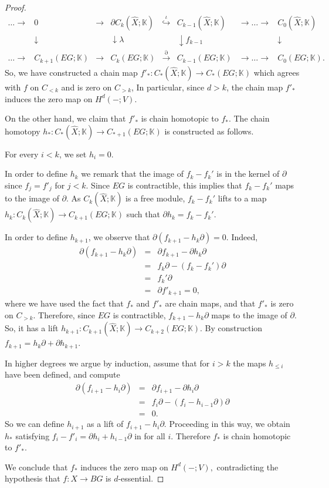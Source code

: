 \documentclass[10pt,a4paper]{amsart}
\begin{document}
\begin{proof}
$$\begin{array}{cccccccc}
\dots\rightarrow & 0&\rightarrow &\partial C_k(\hat X;\mathbb K)&\stackrel{\iota}\hookrightarrow &C_{k-1}(\hat X;\mathbb K)&\rightarrow\dots\rightarrow &C_0(\hat X;\mathbb K)\\
&\downarrow&&\downarrow \lambda&&\downarrow f_{k-1}&&\downarrow\\
\dots\rightarrow & C_{k+1}(EG;\mathbb K)&\rightarrow &C_k(EG;\mathbb K)&\stackrel{\partial}\rightarrow &C_{k-1}(EG;\mathbb K)&\rightarrow\dots\rightarrow &C_0(EG;\mathbb K).
\end{array}
$$
So, we have constructed a chain map $f'_*:C_*(\hat X;\mathbb K)\rightarrow C_*(EG;\mathbb K)$ which agrees with $f$ on $C_{<k}$ and is zero on $C_{>k}$, In particular, since $d>k$, the chain map $f'_*$ induces the zero map on $H^d(-;V)$. %

On the other hand, we claim that $f'_*$ is chain homotopic to $f_*$.
The chain homotopy $h_*:C_{*}(\hat X;\mathbb K)\rightarrow C_{*+1}(EG;\mathbb K)$ is constructed as follows. 

For every $i<k$, we set $h_i=0$. 

In order to define $h_k$ we remark that the image of $f_k-f_k'$ is in the kernel of $\partial$ since $f_j=f'_j$  for $j<k$. Since $EG$ is contractible, this implies that $f_k-f_k'$ maps to the image of $\partial$. As $C_k(\hat X;
\mathbb K)$ is a free module, $f_k-f_k'$ lifts to a map $h_k:C_k(\hat X;\mathbb K)\rightarrow C_{k+1}(EG;\mathbb K)$ such that $\partial h_k=f_k-f_k'$. 

In order to define $h_{k+1}$, we observe that $\partial(f_{k+1}-h_k\partial)=0$. Indeed, 
\begin{eqnarray*}
\partial(f_{k+1}-h_k\partial)&=&\partial f_{k+1}-\partial h_k\partial \\
&=&f_k\partial-(f_k-f_k')\partial\\
&=&f_k'\partial\\
&=&\partial f'_{k+1}=0,
\end{eqnarray*}
where we have used the fact that $f_*$ and $f'_*$ are chain maps, and that $f'_*$ is zero on $C_{>k}$. Therefore, since $EG$ is contractible, $f_{k+1}-h_k\partial$ maps to the image of $\partial$. So, it has a lift $h_{k+1}:C_{k+1}(\hat X;\mathbb K)\rightarrow C_{k+2}(EG;\mathbb K)$. By construction $f_{k+1}=h_k\partial+\partial h_{k+1}$. 

In higher degrees we argue by induction, assume that for $i>k$ the maps $h_{\leq i}$ have been defined, and compute
\begin{eqnarray*}
\partial(f_{i+1}-h_i\partial)&=&\partial f_{i+1}-\partial h_i\partial\\
&=&f_i\partial-(f_i-h_{i-1}\partial)\partial\\
&=&0.
\end{eqnarray*}
So we can define $h_{i+1}$ as a lift of $f_{i+1}-h_i\partial$. Proceeding in this way, we obtain $h_*$ satisfying $f_i-f'_i=\partial h_i+h_{i-1}\partial$ in for all $i$. Therefore $f_*$ is chain homotopic to $f'_*$.

We conclude that $f_*$ induces the zero map on $H^d(-;V),$ contradicting the hypothesis that $f:X\rightarrow BG$ is $d$-essential. 
\end{proof}
\end{document}
